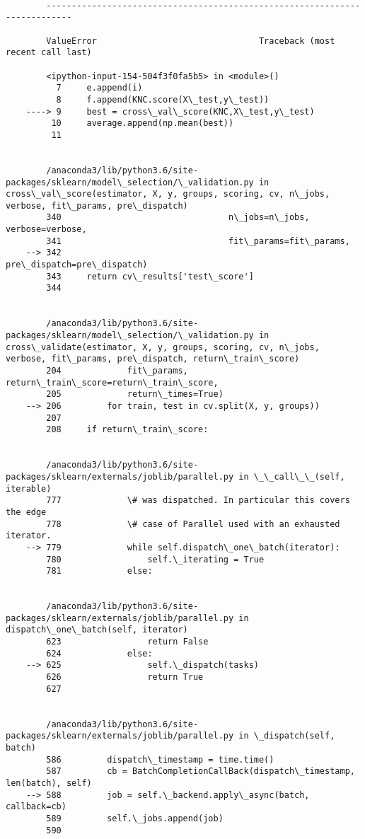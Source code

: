 \documentclass[11pt]{article}
\begin{document}
    \begin{Verbatim}[commandchars=\\\{\}]

        ---------------------------------------------------------------------------

        ValueError                                Traceback (most recent call last)

        <ipython-input-154-504f3f0fa5b5> in <module>()
          7     e.append(i)
          8     f.append(KNC.score(X\_test,y\_test))
    ----> 9     best = cross\_val\_score(KNC,X\_test,y\_test)
         10     average.append(np.mean(best))
         11 


        /anaconda3/lib/python3.6/site-packages/sklearn/model\_selection/\_validation.py in cross\_val\_score(estimator, X, y, groups, scoring, cv, n\_jobs, verbose, fit\_params, pre\_dispatch)
        340                                 n\_jobs=n\_jobs, verbose=verbose,
        341                                 fit\_params=fit\_params,
    --> 342                                 pre\_dispatch=pre\_dispatch)
        343     return cv\_results['test\_score']
        344 


        /anaconda3/lib/python3.6/site-packages/sklearn/model\_selection/\_validation.py in cross\_validate(estimator, X, y, groups, scoring, cv, n\_jobs, verbose, fit\_params, pre\_dispatch, return\_train\_score)
        204             fit\_params, return\_train\_score=return\_train\_score,
        205             return\_times=True)
    --> 206         for train, test in cv.split(X, y, groups))
        207 
        208     if return\_train\_score:


        /anaconda3/lib/python3.6/site-packages/sklearn/externals/joblib/parallel.py in \_\_call\_\_(self, iterable)
        777             \# was dispatched. In particular this covers the edge
        778             \# case of Parallel used with an exhausted iterator.
    --> 779             while self.dispatch\_one\_batch(iterator):
        780                 self.\_iterating = True
        781             else:


        /anaconda3/lib/python3.6/site-packages/sklearn/externals/joblib/parallel.py in dispatch\_one\_batch(self, iterator)
        623                 return False
        624             else:
    --> 625                 self.\_dispatch(tasks)
        626                 return True
        627 


        /anaconda3/lib/python3.6/site-packages/sklearn/externals/joblib/parallel.py in \_dispatch(self, batch)
        586         dispatch\_timestamp = time.time()
        587         cb = BatchCompletionCallBack(dispatch\_timestamp, len(batch), self)
    --> 588         job = self.\_backend.apply\_async(batch, callback=cb)
        589         self.\_jobs.append(job)
        590 



\end{Verbatim}
\end{document}
